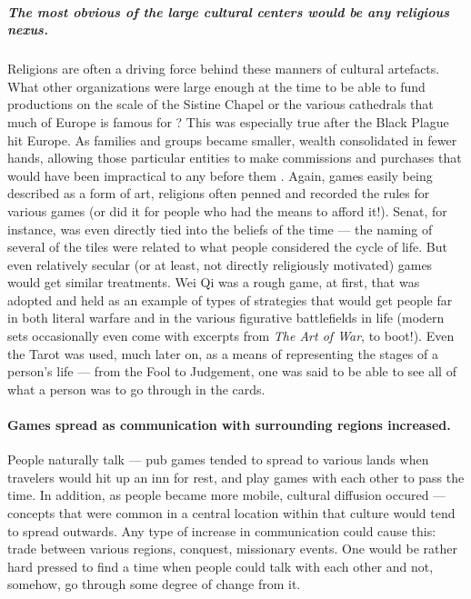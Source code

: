 \subparagraph{The most obvious of the large cultural centers would be any religious nexus.}
Religions are often a driving force behind these manners of cultural artefacts.
What other organizations were large enough at the time to be able to fund productions on the scale of the Sistine Chapel or the various cathedrals that much of Europe is famous for \citep{wiki:christian_art}?
This was especially true after the Black Plague hit Europe.
As families and groups became smaller, wealth consolidated in fewer hands, allowing those particular entities to make commissions and purchases that would have been impractical to any before them \citep{armesto2010}.
Again, games easily being described as a form of art, religions often penned and recorded the rules for various games (or did it for people who had the means to afford it!).
Senat, for instance, was even directly tied into the beliefs of the time --- the naming of several of the tiles were related to what people considered the cycle of life. 
But even relatively secular (or at least, not directly religiously motivated) games would get similar treatments.
Wei Qi was a rough game, at first, that was adopted and held as an example of types of strategies that would get people far in both literal warfare and in the various figurative battlefields in life
(modern sets occasionally even come with excerpts from \emph{The Art of War}, to boot!).
Even the Tarot was used, much later on, as a means of representing the stages of a person's life --- from the Fool to Judgement, one was said to be able to see all of what a person was to go through in the cards. \citep{botermans2008}

\paragraph{Games spread as communication with surrounding regions increased.}
People naturally talk --- pub games tended to spread to various lands when travelers would hit up an inn for rest, and play games with each other to pass the time.
In addition, as people became more mobile, cultural diffusion occured --- concepts that were common in a central location within that culture would tend to spread outwards.
Any type of increase in communication could cause this: trade between various regions, conquest, missionary events.
One would be rather hard pressed to find a time when people could talk with each other and not, somehow, go through some degree of change from it.

